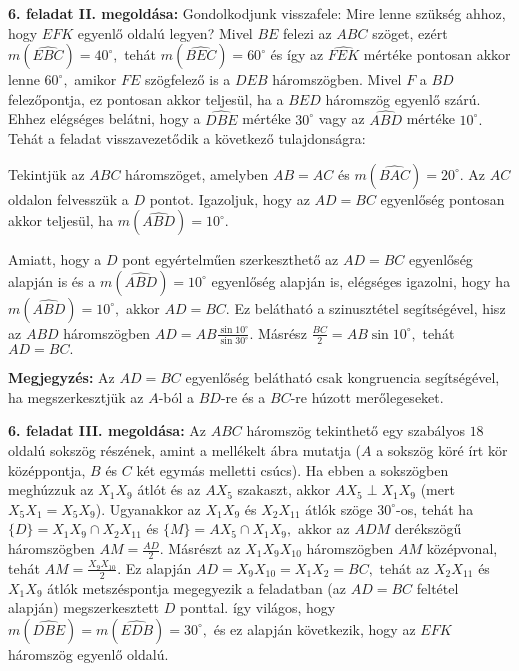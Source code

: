 \documentclass[a4paper,10pt]{article}
\begin{document}
\textbf{6. feladat II. megoldása: } Gondolkodjunk visszafele: Mire
lenne szükség ahhoz, hogy $EFK$ egyen\-lő oldalú legyen?
Mivel $BE$ felezi az $ABC$ szöget, ezért
$m(\widehat{EBC})=40^{\circ},$ tehát $m(\widehat{BEC})=60^{\circ}$
és így az $\widehat{FEK}$ mértéke pontosan akkor lenne
$60^{\circ},$ amikor $FE$ szögfelező is a $DEB$
háromszögben. Mivel $F$ a $BD$ felezőpontja, ez pontosan
akkor teljesül, ha a $BED$ háromszög egyenlő szárú.
Ehhez elégséges belátni, hogy a $\widehat{DBE}$ mértéke
$30^{\circ}$ vagy az $\widehat{ABD}$ mértéke $10^{\circ}.$
Tehát a feladat visszavezetődik a következő
tulajdonságra:

Tekintjük az $ABC$ háromszöget, amelyben $AB=AC$ és
\linebreak $m(\widehat{BAC})=20^{\circ}.$ Az $AC$ oldalon
felvesszük a $D$ pontot. Igazoljuk, hogy az $AD=BC$ egyenl\H
oség pontosan akkor teljesül, ha $m(\widehat{ABD})=10^{\circ}.$

Amiatt, hogy a $D$ pont egyértelműen szerkeszthető az
$AD=BC$ egyenlőség alapján is és a
$m(\widehat{ABD})=10^{\circ}$ egyenlőség alapján is,
elégséges igazolni, hogy ha $m(\widehat{ABD})=10^{\circ},$ akkor
$AD=BC.$ Ez belátható a szinusztétel segítségével, hisz
az $ABD$ háromszögben $AD=AB\frac{\sin 10^{\circ}}{\sin
30^{\circ}}.$ Másrész $\frac{BC}{2}=AB\sin 10^{\circ},$ tehát
$AD=BC.$

\medskip

\textbf{Megjegyzés: } Az $AD=BC$ egyenlőség belátható csak
kong\-ru\-encia segítségével, ha megszerkesztjük az
$A$-ból a $BD$-re és a $BC$-re húzott merőlegeseket.

\medskip
\textbf{6. feladat III. megoldása: } Az $ABC$ háromszög
tekinthető egy szabályos $18$ oldalú sokszög részének,
amint a mellékelt ábra mutatja ($A$ a sokszög köré írt
kör középpontja, $B$ és $C$ két egymás melletti
csúcs). Ha ebben a sokszögben meghúzzuk az $X_1X_9$ átlót
és az $AX_5$ szakaszt, akkor $AX_5 \perp X_1X_9$ (mert
$X_5X_1=X_5X_9$). Ugyan\-akkor az $X_1X_9$ és $X_2X_{11}$
átlók szöge $30^{\circ}$-os, tehát ha \linebreak
$\{D\}=X_1X_9\cap X_2X_{11}$ és $\{M\}=AX_5\cap X_1X_9,$ akkor az
$ADM$ derékszögű háromszögben $AM=\frac{AD}{2}.$
Másrészt az $X_1X_9X_{10}$ háromszögben $AM$ középvonal,
tehát $AM=\frac{X_9X_{10}}{2}.$ Ez alapján
$AD=X_9X_{10}=X_1X_2=BC,$ tehát az $X_2X_{11}$ és $X_1X_9$
átlók metszéspontja megegyezik a feladatban (az $AD=BC$
feltétel alapján) megszerkesztett $D$ ponttal. így világos,
hogy $m(\widehat{DBE})=m(\widehat{EDB})=30^{\circ},$ és ez
alapján következik, hogy az $EFK$ háromszög egyenlő
oldalú.
\end{document}
